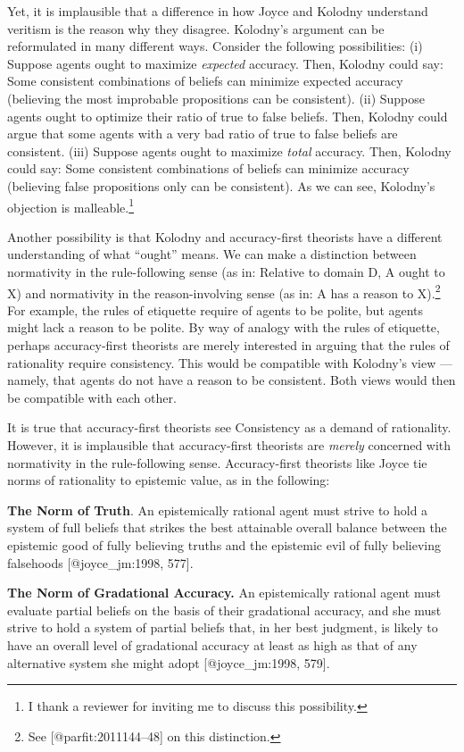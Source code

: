 \documentclass[
]{article}
\begin{document}
Yet, it is implausible that a difference in how Joyce and Kolodny
understand veritism is the reason why they disagree. Kolodny's argument
can be reformulated in many different ways. Consider the following
possibilities: (i) Suppose agents ought to maximize \emph{expected}
accuracy. Then, Kolodny could say: Some consistent combinations of
beliefs can minimize expected accuracy (believing the most improbable
propositions can be consistent). (ii) Suppose agents ought to optimize
their ratio of true to false beliefs. Then, Kolodny could argue that
some agents with a very bad ratio of true to false beliefs are
consistent. (iii) Suppose agents ought to maximize \emph{total}
accuracy. Then, Kolodny could say: Some consistent combinations of
beliefs can minimize accuracy (believing false propositions only can be
consistent). As we can see, Kolodny's objection is malleable.\footnote{I
  thank a reviewer for inviting me to discuss this possibility.}

Another possibility is that Kolodny and accuracy-first theorists have a
different understanding of what ``ought'' means. We can make a
distinction between normativity in the rule-following sense (as in:
Relative to domain D, A ought to X) and normativity in the
reason-involving sense (as in: A has a reason to X).\footnote{See
  {[}@parfit:2011144--48{]} on this distinction.} For example, the rules
of etiquette require of agents to be polite, but agents might lack a
reason to be polite. By way of analogy with the rules of etiquette,
perhaps accuracy-first theorists are merely interested in arguing that
the rules of rationality require consistency. This would be compatible
with Kolodny's view --- namely, that agents do not have a reason to be
consistent. Both views would then be compatible with each other.

It is true that accuracy-first theorists see Consistency as a demand of
rationality. However, it is implausible that accuracy-first theorists
are \emph{merely} concerned with normativity in the rule-following
sense. Accuracy-first theorists like Joyce tie norms of rationality to
epistemic value, as in the following:

\textbf{The Norm of Truth}. An epistemically rational agent must strive
to hold a system of full beliefs that strikes the best attainable
overall balance between the epistemic good of fully believing truths and
the epistemic evil of fully believing falsehoods {[}@joyce\_jm:1998,
577{]}.

\textbf{The Norm of Gradational Accuracy.} An epistemically rational
agent must evaluate partial beliefs on the basis of their gradational
accuracy, and she must strive to hold a system of partial beliefs that,
in her best judgment, is likely to have an overall level of gradational
accuracy at least as high as that of any alternative system she might
adopt {[}@joyce\_jm:1998, 579{]}.
\end{document}
